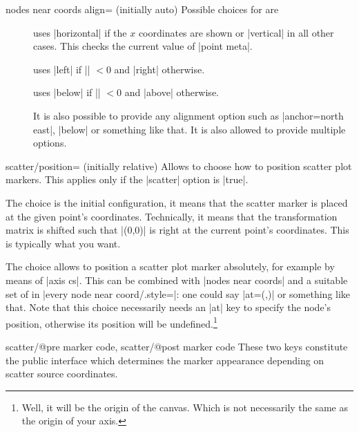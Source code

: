 {\begin{pgfplotskey}{nodes near coords align= (initially auto)}
    Possible choices for  are

    \begin{description}
        \item[] uses |horizontal| if the $x$ coordinates are
            shown or |vertical| in all other cases. This checks the current
            value of |point meta|.
        \item[] uses |left| if |\pgfplotspointmeta| $<0$
            and |right| otherwise.
        \item[]   uses |below| if |\pgfplotspointmeta| $<0$
            and |above| otherwise.
        \item[] It is also possible to provide any \Tikz{} alignment option
            such as |anchor=north east|, |below| or something like that. It
            is also allowed to provide multiple options.
    \end{description}
\end{pgfplotskey}

\begin{pgfplotskey}{scatter/position= (initially relative)}
    Allows to choose how to position scatter plot markers. This applies only if
    the |scatter| option is |true|.

    The choice  is the initial configuration, it means
    that the scatter marker is placed at the given point's coordinates.
    Technically, it means that the transformation matrix is shifted such that
    |(0,0)| is right at the current point's coordinates. This is typically what
    you want.

    The choice  allows to position a scatter plot marker
    absolutely, for example by means of |axis cs|. This can be combined with
    |nodes near coords| and a suitable set of  in
    |every node near coord/.style=|: one could say
    |at={(\coordindex,)}| or something like that. Note that this
    choice necessarily needs an |at| key to specify the node's position,
    otherwise its position will be undefined.\footnote{Well, it will be the
    origin of the canvas. Which is not necessarily the same as the origin of
    your axis.}
\end{pgfplotskey}

\begin{pgfplotsxycodekeylist}{%
    scatter/@pre marker code,
    scatter/@post marker code%
}
    These two keys constitute the public interface which determines the marker
    appearance depending on scatter source coordinates.


\end{pgfplotsxycodekeylist}}
